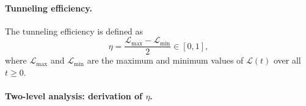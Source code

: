 \paragraph{Tunneling efficiency.}

The tunneling efficiency is defined as
\begin{equation}\label{eq:eta_def}
  \eta = \frac{\mathcal{L}_{\max} - \mathcal{L}_{\min}}{2} \in [0,1],
\end{equation}
where $\mathcal{L}_{\max}$ and $\mathcal{L}_{\min}$ are the maximum and minimum values of $\mathcal{L}(t)$ over all $t \geq 0$.

\paragraph{Two-level analysis: derivation of $\eta$.}

